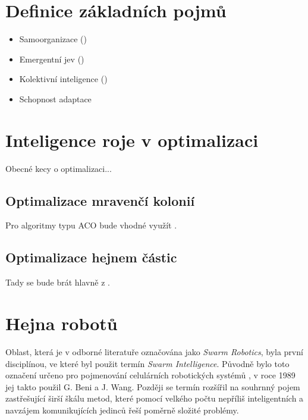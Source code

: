 \documentclass[a4paper,12pt]{article}
\let\stdsection\section
\renewcommand\section{\newpage\stdsection}
\begin{document}

\section{Definice základních pojmů}
\begin{itemize}
  \item Samoorganizace (\cite{fleischer2005})
  \item Emergentní jev (\cite{fleischer2005})
  \item Kolektivní inteligence (\cite{fleischer2005})
  \item Schopnost adaptace
\end{itemize}




\section{Inteligence roje v optimalizaci}
Obecné kecy o optimalizaci...

\subsection{Optimalizace mravenčí kolonií}
Pro algoritmy typu ACO bude vhodné využít \cite{Dorigo06antcolony}.

\subsection{Optimalizace hejnem částic}
Tady se bude brát hlavně z \cite{Blum08SwarmOpt}.





\section{Hejna robotů}
Oblast, která je v odborné literatuře označována jako {\it Swarm Robotics}, byla první
disciplínou, ve které byl použit termín {\it Swarm Intelligence}. Původně bylo toto
označení určeno pro pojmenování celulárních robotických systémů \cite{BeniWang89}, v roce
1989 jej takto použil G. Beni a J. Wang. Později se termín rozšířil na souhrnný pojem
zastřešující širší škálu metod, které pomocí velkého počtu nepříliš inteligentních
a navzájem komunikujících jedinců řeší poměrně složité problémy.
\end{document}
